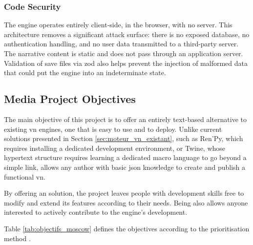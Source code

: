 \subsubsection{Code Security}

The engine operates entirely client-side, in the browser, with no  server. This architecture removes a significant attack surface: there is no exposed database, no authentication handling, and no user data transmitted to a third-party server. The narrative content is static and does not pass through an application server. Validation of save files via \gls{zod} also helps prevent the injection of malformed data that could put the engine into an indeterminate state.


\subsection{Media Project Objectives} \label{sec:objMediaProject}

The main objective of this project is to offer an entirely text-based alternative to existing \gls{vn} engines, one that is easy to use and to deploy. Unlike current solutions presented in Section \ref{sec:moteur_vn_existant}, such as Ren'Py, which requires installing a dedicated development environment, or Twine, whose hypertext structure requires learning a dedicated macro language to go beyond a simple link, \nsits allows any author with basic \gls{json} knowledge to create and publish a functional \gls{vn}.

By offering an  solution, the project leaves people with development skills free to modify and extend its features according to their needs. Being  also allows anyone interested to actively contribute to the engine's development.

\clearpage

Table \ref{tab:objectifs_moscow} defines the objectives according to the  prioritisation method \parencite{clegg_case_1994}.

